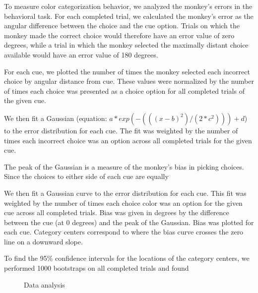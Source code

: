 
To measure color categorization behavior, we analyzed the monkey's errors in the behavioral task. For each completed trial, we calculated the monkey's error as the angular difference between the choice and the cue option. Trials on which the monkey made the correct choice would therefore have an error value of zero degrees, while a trial in which the monkey selected the maximally distant choice available would have an error value of 180 degrees. %

For each cue, we plotted the number of times the monkey selected each incorrect choice by angular distance from cue. These values were normalized by the number of times each choice was presented as a choice option for all completed trials of the given cue.

We then fit a Gaussian (equation: $a*exp(-(((x-b)^2)/(2*c^2)))+d$) to the error distribution for each cue. The fit was weighted by the number of times each incorrect choice was an option across all completed trials for the given cue.

The peak of the Gaussian is a measure of the monkey's bias in picking choices. Since the choices to either side of each cue are equally

We then fit a Gaussian curve to the error distribution for each cue. This fit was weighted by the number of times each choice color was an option for the given cue across all completed trials. Bias was given in degrees by the difference between the cue (at 0 degrees) and the peak of the Gaussian. Bias was plotted for each cue. Category centers correspond to where the bias curve crosses the zero line on a downward slope.

To find the 95\% confidence intervals for the locations of the category centers, we performed 1000 bootstraps on all completed trials and found 


\begin{figure}

\caption{Data analysis} 
\label{fig:dataAnalysis}
\end{figure}